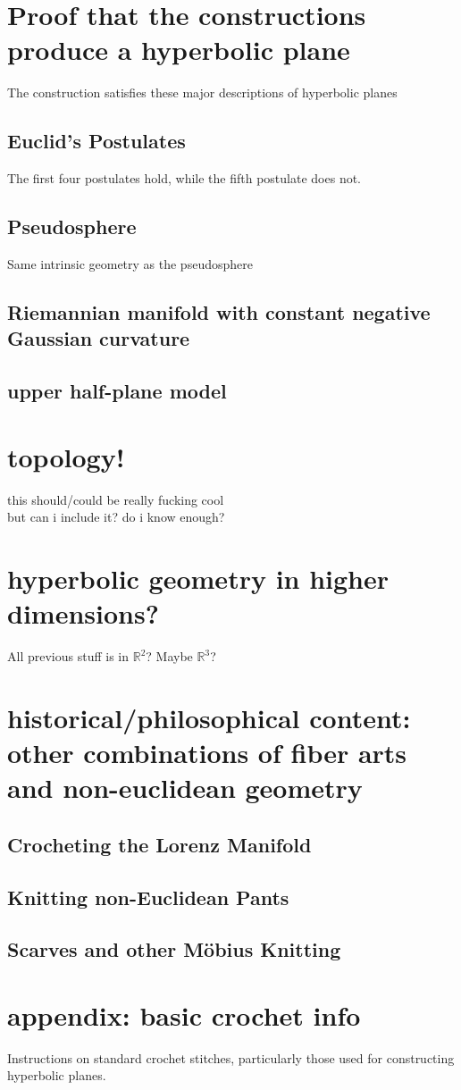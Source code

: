 \documentclass{article}
\begin{document}
\section{Proof that the constructions produce a hyperbolic plane}
The construction satisfies these major descriptions of hyperbolic planes
\subsection{Euclid's Postulates}
The first four postulates hold, while the fifth postulate does not.
\subsection{Pseudosphere}
Same intrinsic geometry as the pseudosphere
\subsection{Riemannian manifold with constant negative Gaussian curvature}
\subsection{upper half-plane model}

\section{topology!}
this should/could be really fucking cool\\
but can i include it? do i know enough?

\section{hyperbolic geometry in higher dimensions?}
All previous stuff is in $\mathbb{R}^2$? Maybe $\mathbb{R}^3$?

\section{historical/philosophical content: other combinations of fiber arts and non-euclidean geometry}
\subsection{Crocheting the Lorenz Manifold \cite{crochetlorenz}}
\subsection{Knitting non-Euclidean Pants \cite{makingmath}}
\subsection{Scarves and other M\"obius Knitting \cite{magicalknitting}\cite{magicalknitting2}}

\section{appendix: basic crochet info}
Instructions on standard crochet stitches, particularly those used for constructing hyperbolic planes. \cite{happyhooker}

\newpage


\end{document}

